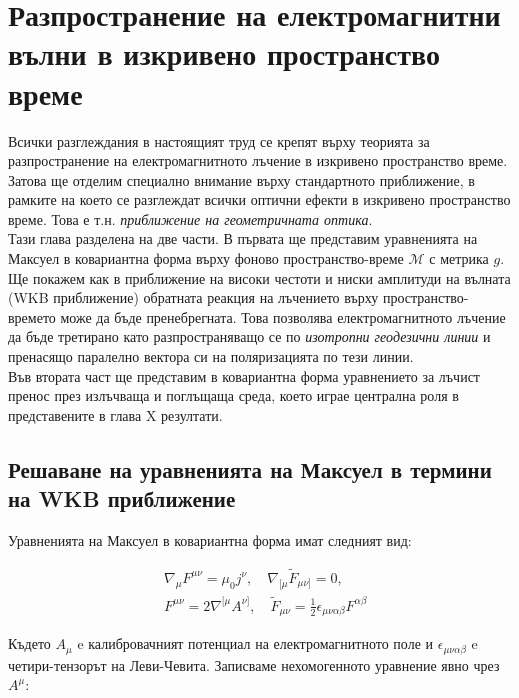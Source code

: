 \section{Разпространение на електромагнитни вълни в изкривено пространство време}

Всички разглеждания в настоящият труд се крепят върху теорията за разпространение на електромагнитното лъчение в изкривено пространство време. Затова ще отделим специално внимание върху стандартното приближение, в рамките на което се разглеждат всички оптични ефекти в изкривено пространство време. Това е т.н. \emph{приближение на геометричната оптика}. \\

Тази глава разделена на две части. В първата ще представим уравненията на Максуел в ковариантна форма върху фоново пространство-време $\mathcal{M}$ с метрика $g$. Ще покажем как в приближение на високи честоти и ниски амплитуди на вълната (WKB приближение) обратната реакция на лъчението върху пространство-времето може да бъде пренебрегната. Това позволява електромагнитното лъчение да бъде третирано като разпространяващо се по \emph{изотропни геодезични линии} и пренасящо паралелно вектора си на поляризацията по тези линии.\\
Във втората част ще представим в ковариантна форма уравнението за лъчист пренос през излъчваща и поглъщаща среда, което играе централна роля в представените в глава {\color{red} X} резултати.

\subsection{Решаване на уравненията на Максуел в термини на WKB приближение}

Уравненията на Максуел в ковариантна форма имат следният вид:

\begin{subequations}
	\begin{align}
	&\nabla_\mu F^{\mu\nu} = \mu_0 j^\nu,\quad \nabla_{[\mu}\tilde{F}_{\mu\nu]} = 0,\\
	&F^{\mu\nu} = 2\nabla^{[\mu}A^{\nu]}, \quad \tilde{F}_{\mu\nu} = \frac{1}{2}\epsilon_{\mu\nu\alpha\beta}F^{\alpha\beta}
	\end{align}
\end{subequations}

Където $A_\mu$ e калибровачният потенциал на електромагнитното поле и $\epsilon_{\mu\nu\alpha\beta}$ e четири-тензорът на Леви-Чевита. Записваме нехомогенното уравнение явно чрез $A^\mu$:

